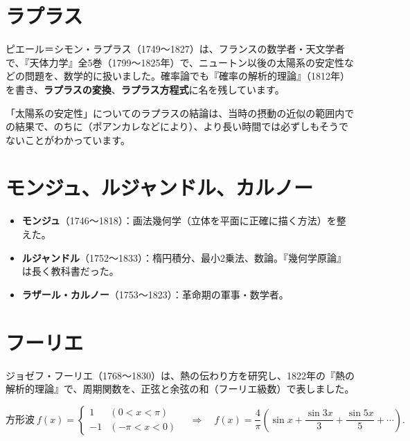 \documentclass[a4paper,11pt,openany]{ltjsbook}
\begin{document}
\section{ラプラス}

ピエール＝シモン・ラプラス（1749〜1827）は、フランスの数学者・天文学者で、『天体力学』全5巻（1799〜1825年）で、ニュートン以後の太陽系の安定性などの問題を、数学的に扱いました。確率論でも『確率の解析的理論』（1812年）を書き、\textbf{ラプラスの変換}、\textbf{ラプラス方程式}に名を残しています。

「太陽系の安定性」についてのラプラスの結論は、当時の摂動の近似の範囲内での結果で、のちに（ポアンカレなどにより）、より長い時間では必ずしもそうでないことがわかっています。

\section{モンジュ、ルジャンドル、カルノー}

\begin{itemize}[leftmargin=*]
\item \textbf{モンジュ}（1746〜1818）：画法幾何学（立体を平面に正確に描く方法）を整えた。
\item \textbf{ルジャンドル}（1752〜1833）：楕円積分、最小2乗法、数論。『幾何学原論』は長く教科書だった。
\item \textbf{ラザール・カルノー}（1753〜1823）：革命期の軍事・数学者。
\end{itemize}

\section{フーリエ}

ジョゼフ・フーリエ（1768〜1830）は、熱の伝わり方を研究し、1822年の『熱の解析的理論』で、周期関数を、正弦と余弦の和（フーリエ級数）で表しました。

\[
\text{方形波}\ f(x)=\begin{cases}1&(0<x<\pi)\\-1&(-\pi<x<0)\end{cases}
\quad\Longrightarrow\quad
f(x)=\frac4\pi\left(\sin x+\frac{\sin3x}{3}+\frac{\sin5x}{5}+\cdots\right).
\]
\end{document}
